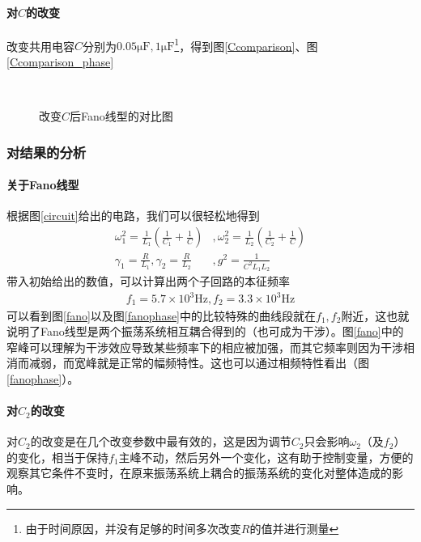 \documentclass{ctexart}
\begin{document}
	\paragraph{对$C$的改变}
	改变共用电容$C$分别为$0.05\mathrm{\mu F},1\mathrm{\mu F}$\footnote{由于时间原因，并没有足够的时间多次改变$R$的值并进行测量}，得到图\ref{Ccomparison}、图\ref{Ccomparison_phase}
	\begin{figure}[H]
		\centering
		\\
		\caption{改变$C$后Fano线型的对比图}
	\end{figure}
	\subsubsection{对结果的分析}
	\paragraph{关于Fano线型}
	根据图\ref{circuit}给出的电路，我们可以很轻松地得到
	\begin{align}
		\omega_1^2=\frac{1}{L_1}(\frac{1}{C_1}+\frac{1}{C})&,\omega_2^2=\frac{1}{L_2}(\frac{1}{C_2}+\frac{1}{C})\label{eq:omega}\\
		\gamma_1=\frac{R}{L_1},\gamma_2=\frac{R}{L_2}&,g^2=\frac{1}{C^2L_1L_2}\label{eq:gamma}
	\end{align}
	带入初始给出的数值，可以计算出两个子回路的本征频率
	\begin{align}
		f_1=5.7\times10^3\mathrm{Hz},f_2=3.3\times10^3\mathrm{Hz}
	\end{align}
	可以看到图\ref{fano}以及图\ref{fanophase}中的比较特殊的曲线段就在$f_1,f_2$附近，这也就说明了Fano线型是两个振荡系统相互耦合得到的（也可成为干涉）。图\ref{fano}中的窄峰可以理解为干涉效应导致某些频率下的相应被加强，而其它频率则因为干涉相消而减弱，而宽峰就是正常的幅频特性。这也可以通过相频特性看出（图\ref{fanophase}）。
	\paragraph{对$C_2$的改变}
	对$C_2$的改变是在几个改变参数中最有效的，这是因为调节$C_2$只会影响$\omega_2$（及$f_2$）的变化，相当于保持$f_1$主峰不动，然后另外一个变化，这有助于控制变量，方便的观察其它条件不变时，在原来振荡系统上耦合的振荡系统的变化对整体造成的影响。
	
\end{document}
